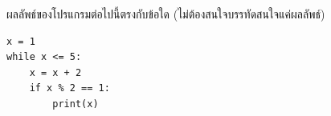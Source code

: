 ﻿%
\question ผลลัพธ์ของโปรแกรมต่อไปนี้ตรงกับข้อใด (ไม่ต้องสนใจบรรทัดสนใจแค่ผลลัพธ์)
\begin{verbatim}
x = 1
while x <= 5:
    x = x + 2
    if x % 2 == 1:
        print(x)
\end{verbatim}
